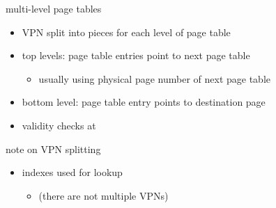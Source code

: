 \begin{frame}{multi-level page tables}
    \begin{itemize}
    \item VPN split into pieces for each level of page table
    \vspace{.5cm}
    \item top levels: page table entries point to next page table
        \begin{itemize}
        \item usually using physical page number of next page table
        \end{itemize}
    \item bottom level: page table entry points to destination page
    \vspace{.5cm}
    \item validity checks at 
    \end{itemize}
\end{frame}


\begin{frame}{note on VPN splitting}
    \begin{itemize}
    \item indexes used for lookup 
        \begin{itemize}
        \item (there are not multiple VPNs)
        \end{itemize}
    \end{itemize}
\end{frame}
